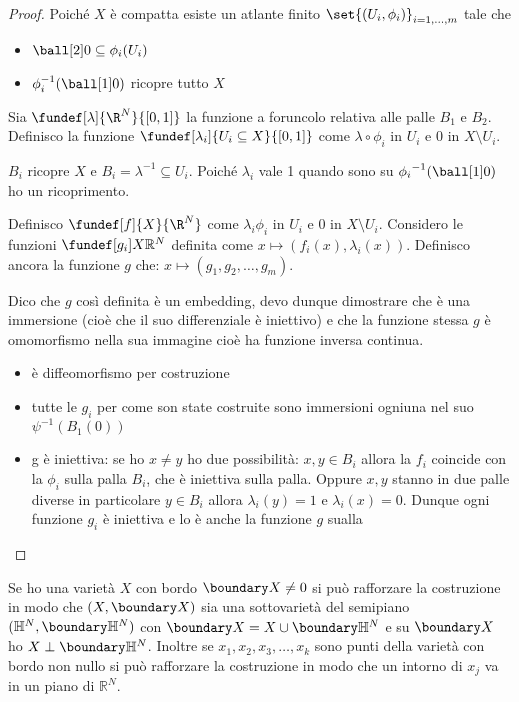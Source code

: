 \begin{proof}
 Poiché $X$ è compatta esiste un atlante finito $\set{(U_i, \phi_i)}_{i = 1, ..., m}$ tale che 
 \begin{itemize}
  \item $\ball[2]0 \subseteq {\phi}_{i}(U_{i})$
  \item ${\phi_{i}^{-1}(\ball[1]0)}$ ricopre tutto $X$
  \end{itemize}
 Sia $\fundef[\lambda]{\R^N}{[0, 1]}$ la funzione a foruncolo relativa alle palle $B_{1}$ e $B_{2}$. Definisco la funzione $\fundef[\lambda_i]{U_i\subseteq X}{[0,1]}$
 come $\lambda \circ \phi_{i}$ in $U_{i}$ e $0$ in $X \setminus U_{i}$.
 
 ${B_{i}}$ ricopre $X$ e $B_{i} = {\lambda}^{-1} \subseteq U_{i}$. Poiché $\lambda_i$ vale 1 quando sono su ${\phi_{i}}^{-1} (\ball[1]0)$ ho un ricoprimento.

 
 Definisco $\fundef[f]{X}{\R^N}$ come $\lambda_{i}  \phi_{i}$ in $U_{i}$ e $0$ in $X \setminus U_{i}$. Considero le funzioni $\fundef[g_{i}]{X}{\mathbb{R}^{N}}$
 definita come $x \mapsto (f_{i}(x), \lambda_{i}(x))$. Definisco ancora la funzione $g$ che: $x \mapsto (g_1, g_2, \dots, g_m)$.
 
 
 Dico che $g$ così definita è un embedding, devo dunque dimostrare che è una immersione (cioè che il suo differenziale è iniettivo) e che la funzione stessa $g$ è omomorfismo nella sua immagine
 cioè ha funzione inversa continua.
 
 \begin {itemize}
  \item è diffeomorfismo per costruzione
  \item tutte le $g_{i}$ per come son state costruite sono immersioni ogniuna nel suo $\psi^{-1}(B_1(0))$
  \item g è iniettiva: se ho $x \neq y$  ho due possibilità: $x, y \in B_{i}$ allora la $f_i$ coincide con la $\phi_i$ sulla palla $B_{i}$, che è iniettiva sulla palla. 
  Oppure $x, y$ stanno in due palle diverse in particolare $y \in B_{i}$ allora $\lambda_{i}(y) = 1$ e $\lambda_{i}(x) = 0$. Dunque ogni funzione $g_i$ è iniettiva e lo è anche la funzione
  $g$ sualla
  \qedhere
 \end {itemize}
\end{proof}

Se ho una varietà $X$ con bordo $\boundary X \neq 0$ si può rafforzare la costruzione in modo che $(X, \boundary X)$ sia una sottovarietà del semipiano 
$(\mathbb{H}^{N}, \boundary \mathbb{H}^{N})$ con $\boundary X = X \cup \boundary \mathbb{H}^{N}$ e su $\boundary X$ ho $X \perp \boundary \mathbb{H}^{N}$.
Inoltre se $x_{1}, x_{2}, x_{3}, \dots, x_{k}$ sono punti della varietà con bordo non nullo si può rafforzare la costruzione in modo che un intorno di $x_{j}$ va in un piano di $\mathbb{R}^{N}$.

